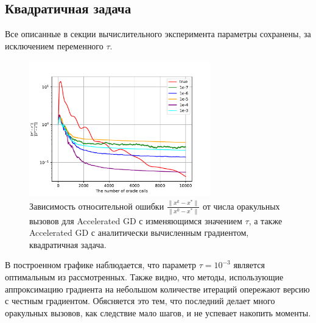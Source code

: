 \documentclass{article}
\begin{document}
\subsection{Квадратичная задача}
Все описанные в секции вычислительного эксперимента параметры сохранены, за исключением переменного $\tau$.\\
\begin{figure}[!htbp]
\centering
  \includegraphics[width=0.7\textwidth]{../figures/Error_analysis_quadratic_sigma=1e-6.pdf}
 \caption{Зависимость относительной ошибки $\frac{\|x^k - x^*\|}{\|x^0 - x^*\|}$ от числа оракульных вызовов для Accelerated GD с изменяющимся значением $\tau$, а также Accelerated GD с аналитически вычисленным градиентом, квадратичная задача.}
  \label{fig:non-stochastic_quadratic}
\end{figure}
В построенном графике наблюдается, что параметр $\tau=10^{-3}$ является оптимальным из рассмотренных. Также видно, что методы, использующие аппроксимацию градиента на небольшом количестве итераций опережают версию с честным градиентом. Обясняется это тем, что последний делает много оракульных вызовов, как следствие мало шагов, и не успевает накопить моменты.
\end{document}
